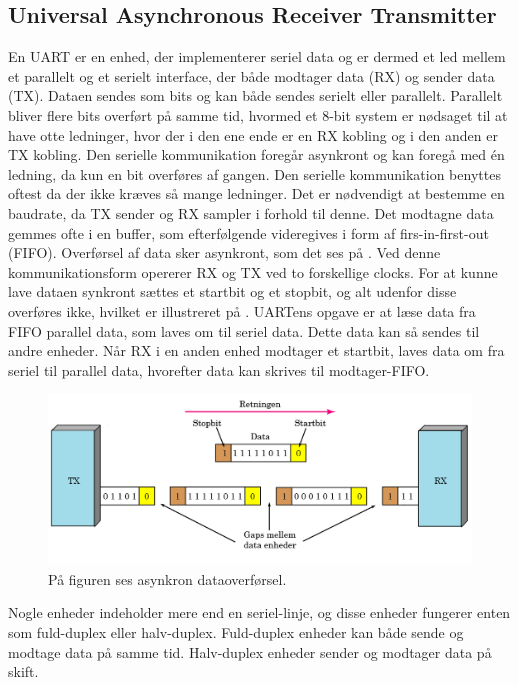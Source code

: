 \subsection{Universal Asynchronous Receiver Transmitter}
En UART er en enhed, der implementerer seriel data og er dermed et led mellem et parallelt og et serielt interface, der både modtager data (RX) og sender data (TX). Dataen sendes som bits og kan både sendes serielt eller parallelt. \citep{Jimb02016a,Chun-zhiYin-shuiLun-yao2011} Parallelt bliver flere bits overført på samme tid, hvormed et 8-bit system er nødsaget til at have otte ledninger, hvor der i den ene ende er en RX kobling og i den anden er TX kobling. \citep{Jimb02016a} Den serielle kommunikation foregår asynkront og kan foregå med én ledning, da kun en bit overføres af gangen. Den serielle kommunikation benyttes oftest da der ikke kræves så mange ledninger. Det er nødvendigt at bestemme en baudrate, da TX sender og RX sampler i forhold til denne. Det modtagne data gemmes ofte i en buffer, som efterfølgende videregives i form af firs-in-first-out (FIFO). \citep{Jimb02016a}\newline 
Overførsel af data sker asynkront, som det ses på . Ved denne kommunikationsform opererer RX og TX ved to forskellige clocks. For at kunne lave dataen synkront sættes et startbit og et stopbit, og alt udenfor disse overføres ikke, hvilket er illustreret på . UARTens opgave er at læse data fra FIFO parallel data, som laves om til seriel data. Dette data kan så sendes til andre enheder. Når RX i en anden enhed modtager et startbit, laves data om fra seriel til parallel data, hvorefter data kan skrives til modtager-FIFO. \citep{Jimb02016a,Chun-zhiYin-shuiLun-yao2011}
\begin{figure}[H]
	\centering
	\includegraphics[scale=0.6]{figures/bProblemloesning/asynkron.png}
	\caption{På figuren ses asynkron dataoverførsel. \citep{Jimb02016}}
	\label{fig:asynkron}
\end{figure}
Nogle enheder indeholder mere end en seriel-linje, og disse enheder fungerer enten som fuld-duplex eller halv-duplex. Fuld-duplex enheder kan både sende og modtage data på samme tid. Halv-duplex enheder sender og modtager data på skift. \citep{Jimb02016a,Chun-zhiYin-shuiLun-yao2011}